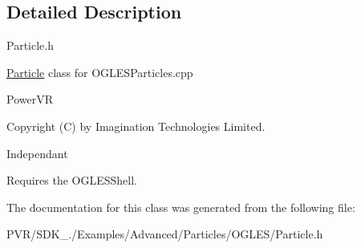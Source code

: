 \subsection{Detailed Description}


  Particle.\+h

\hyperlink{struct_particle}{Particle} class for O\+G\+L\+E\+S\+Particles.\+cpp

Power\+V\+R

Copyright (C) by Imagination Technologies Limited.

Independant

Requires the O\+G\+L\+E\+S\+Shell. 

The documentation for this class was generated from the following file\+:\begin{DoxyCompactItemize}
\item 
P\+V\+R/\+S\+D\+K\+\_./\+Examples/\+Advanced/\+Particles/\+O\+G\+L\+E\+S/Particle.\+h\end{DoxyCompactItemize}
